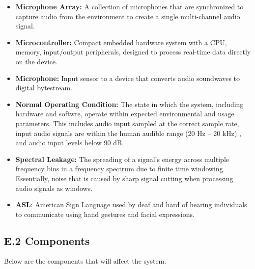 \documentclass[12pt]{article}
\theoremstyle{definition}
\begin{document}
\begin{itemize}
    \item \textbf{Microphone Array:}\label{def:microphone_array} A collection of 
    microphones that are synchronized to capture audio from the 
    environment to create a single multi-channel audio signal.

    \item \textbf{Microcontroller:}\label{def:microcontroller} Compact embedded
    hardware system with a CPU, memory, input/output peripherals, designed to
    process real-time data directly on the device.

    \item \textbf{Microphone:}\label{def:microphone} Input sensor to a device
    that converts audio soundwaves to digital bytestream.

    \item \textbf{Normal Operating Condition:}
    \label{def:normal_operation_condition} The state in which the system,
    including hardware and softwre, operate within expected environmental and
    usage parameters. This includes audio input sampled at the correct sample
    rate, input audio signals are within the human audible range
    (20 Hz – 20 kHz) \cite{Neuroscience2001}, and audio input levels below
    90 dB.

    \item \textbf{Spectral Leakage:} \label{def:spectral_leakage} 
    The spreading of a signal's energy across multiple frequency bins in a
    frequency spectrum due to finite time windowing. Essentially, noise that is
    caused by sharp signal cutting when processing audio signals as windows.

    \item \textbf{ASL}: American Sign Language used by deaf and hard of hearing
    individuals to communicate using hand gestures and facial expressions.

\end{itemize}

\subsection{E.2 Components}

Below are the components that will affect the system.
\end{document}
